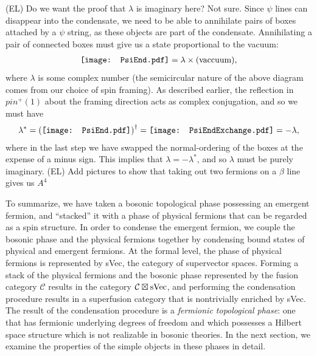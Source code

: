 \documentclass[12pt,a4paper]{article}
\newcommand{\mcc}{\mathcal{C}}
\newcommand{\ethan}[1]{{\color{amethyst}\footnotesize{(EL) #1}}}
\newcommand{\PsiEnd}{\mathord{\vcenter{\hbox{\texttt{[image: PsiEnd.pdf]}}}}}
\newcommand{\PsiEndExchange}{\mathord{\vcenter{\hbox{\texttt{[image: PsiEndExchange.pdf]}}}}}
\begin{document}
\ethan{Do we want the proof that $\lambda$ is imaginary here? Not sure.}
Since $\psi$ lines can disappear into the condensate, we need to be able to annihilate pairs of boxes attached by a $\psi$ string, as these objects are part of the condensate. Annihilating a pair of connected boxes must give us a state proportional to the vacuum:
\begin{align}
\PsiEnd  = \lambda \times \text{(vaccuum)},
\label{EvalPsiPsi}
\end{align}
where $\lambda$ is some complex number (the semicircular nature of the above diagram comes from our choice of spin framing). As described earlier, the reflection in $pin^+(1)$ about the framing direction acts as complex conjugation, and so we must have
\begin{align}
\lambda^{*} = \left( \PsiEnd \right) ^{\dagger}  = \PsiEndExchange = - \lambda,
\label{phase}
\end{align}
where in the last step we have swapped the normal-ordering of the boxes at the expense of a minus sign. 
This implies that $\lambda = - \lambda^*$, and so $\lambda$ must be purely imaginary. \ethan{Add pictures to show that taking out two fermions on a $\beta$ line gives us $A^4$}

To summarize, we have taken a bosonic topological phase possessing an emergent fermion, and ``stacked'' it with a phase of physical fermions that can be regarded as a spin structure. 
In order to condense the emergent fermion, we couple the bosonic phase and the physical fermions together by condensing bound states of physical and emergent fermions. 
At the formal level, the phase of physical fermions is represented by sVec, the category of supervector spaces. 
Forming a stack of the physical fermions and the bosonic phase represented by the fusion category $\mcc$ results in the category $\mcc \boxtimes {\rm sVec}$, and performing the condensation procedure results in a superfusion category that is nontrivially enriched by sVec. 
The result of the condensation procedure is a {\it fermionic topological phase}: one that has fermionic underlying degrees of freedom and which possesses a Hilbert space structure which is not realizable in bosonic theories. 
In the next section, we examine the properties of the simple objects in these phases in detail. 
\end{document}

